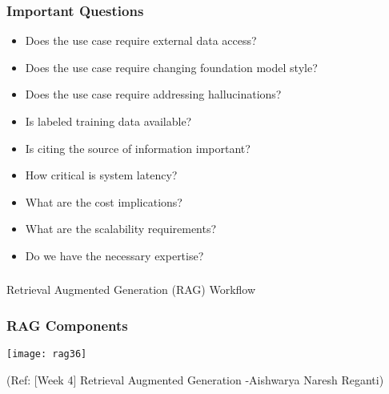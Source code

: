

\begin{frame}[fragile]\frametitle{Important Questions}
\begin{itemize}
  \item Does the use case require external data access?
  \item Does the use case require changing foundation model style?
  \item Does the use case require addressing hallucinations?
  \item Is labeled training data available?
  \item Is citing the source of information important?
  \item How critical is system latency?
  \item What are the cost implications?
  \item What are the scalability requirements?
  \item Do we have the necessary expertise?
\end{itemize}
\end{frame}



\begin{frame}[fragile]\frametitle{}
\begin{center}
{\Large Retrieval Augmented Generation (RAG) Workflow}
\end{center}
\end{frame}

\begin{frame}[fragile]\frametitle{RAG Components}


		\begin{center}
		\texttt{[image: rag36]}
		\end{center}

{\tiny (Ref: [Week 4] Retrieval Augmented Generation -Aishwarya Naresh Reganti)}

\end{frame}

